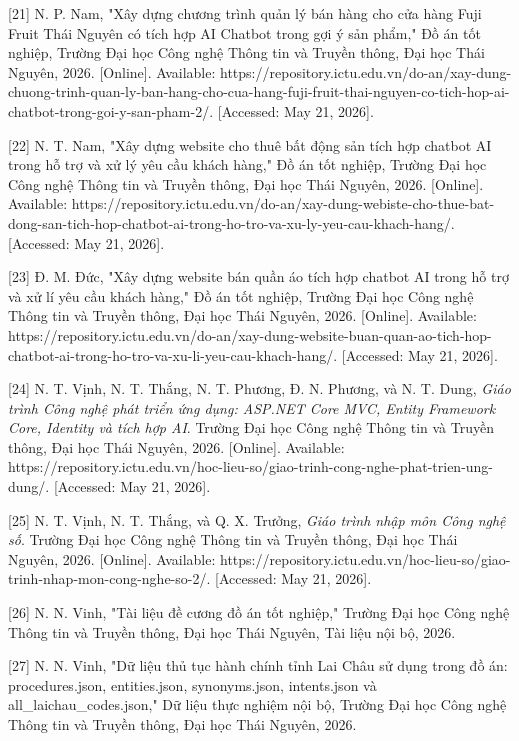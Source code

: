 {[}21{]} N. P. Nam, "Xây dựng chương trình quản lý bán hàng cho cửa hàng
Fuji Fruit Thái Nguyên có tích hợp AI Chatbot trong gợi ý sản phẩm," Đồ
án tốt nghiệp, Trường Đại học Công nghệ Thông tin và Truyền thông, Đại
học Thái Nguyên, 2026. {[}Online{]}. Available:
https://repository.ictu.edu.vn/do-an/xay-dung-chuong-trinh-quan-ly-ban-hang-cho-cua-hang-fuji-fruit-thai-nguyen-co-tich-hop-ai-chatbot-trong-goi-y-san-pham-2/.
{[}Accessed: May 21, 2026{]}.

{[}22{]} N. T. Nam, "Xây dựng website cho thuê bất động sản tích hợp
chatbot AI trong hỗ trợ và xử lý yêu cầu khách hàng," Đồ án tốt nghiệp,
Trường Đại học Công nghệ Thông tin và Truyền thông, Đại học Thái Nguyên,
2026. {[}Online{]}. Available:
https://repository.ictu.edu.vn/do-an/xay-dung-webiste-cho-thue-bat-dong-san-tich-hop-chatbot-ai-trong-ho-tro-va-xu-ly-yeu-cau-khach-hang/.
{[}Accessed: May 21, 2026{]}.

{[}23{]} Đ. M. Đức, "Xây dựng website bán quần áo tích hợp chatbot AI
trong hỗ trợ và xử lí yêu cầu khách hàng," Đồ án tốt nghiệp, Trường Đại
học Công nghệ Thông tin và Truyền thông, Đại học Thái Nguyên, 2026.
{[}Online{]}. Available:
https://repository.ictu.edu.vn/do-an/xay-dung-website-buan-quan-ao-tich-hop-chatbot-ai-trong-ho-tro-va-xu-li-yeu-cau-khach-hang/.
{[}Accessed: May 21, 2026{]}.

{[}24{]} N. T. Vịnh, N. T. Thắng, N. T. Phương, Đ. N. Phương, và N. T.
Dung, \emph{Giáo trình Công nghệ phát triển ứng dụng: ASP.NET Core MVC,
Entity Framework Core, Identity và tích hợp AI}. Trường Đại học Công
nghệ Thông tin và Truyền thông, Đại học Thái Nguyên, 2026. {[}Online{]}.
Available:
https://repository.ictu.edu.vn/hoc-lieu-so/giao-trinh-cong-nghe-phat-trien-ung-dung/.
{[}Accessed: May 21, 2026{]}.

{[}25{]} N. T. Vịnh, N. T. Thắng, và Q. X. Trưởng, \emph{Giáo trình nhập
môn Công nghệ số}. Trường Đại học Công nghệ Thông tin và Truyền thông,
Đại học Thái Nguyên, 2026. {[}Online{]}. Available:
https://repository.ictu.edu.vn/hoc-lieu-so/giao-trinh-nhap-mon-cong-nghe-so-2/.
{[}Accessed: May 21, 2026{]}.

{[}26{]} N. N. Vinh, "Tài liệu đề cương đồ án tốt nghiệp," Trường Đại
học Công nghệ Thông tin và Truyền thông, Đại học Thái Nguyên, Tài liệu
nội bộ, 2026.

{[}27{]} N. N. Vinh, "Dữ liệu thủ tục hành chính tỉnh Lai Châu sử dụng
trong đồ án: procedures.json, entities.json, synonyms.json, intents.json
và all\_laichau\_codes.json," Dữ liệu thực nghiệm nội bộ, Trường Đại học
Công nghệ Thông tin và Truyền thông, Đại học Thái Nguyên, 2026.
